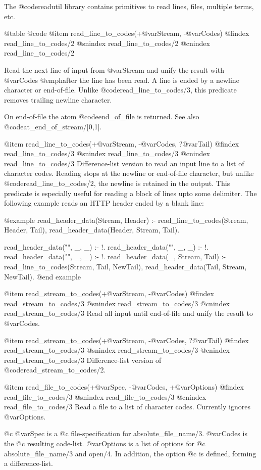 {{{{{{{{The @code{readutil} library contains primitives to read lines, files,
multiple terms, etc.

@table @code
@item read_line_to_codes(+@var{Stream}, -@var{Codes})
@findex read_line_to_codes/2
@snindex read_line_to_codes/2
@cnindex read_line_to_codes/2

Read the next line of input from @var{Stream} and unify the result with
@var{Codes} @emph{after} the line has been read.  A line is ended by a
newline character or end-of-file. Unlike @code{read_line_to_codes/3},
this predicate removes trailing newline character.

On end-of-file the atom @code{end_of_file} is returned.  See also
@code{at_end_of_stream/[0,1]}.

@item read_line_to_codes(+@var{Stream}, -@var{Codes}, ?@var{Tail})
@findex read_line_to_codes/3
@snindex read_line_to_codes/3
@cnindex read_line_to_codes/3
Difference-list version to read an input line to a list of character
codes.  Reading stops at the newline or end-of-file character, but
unlike @code{read_line_to_codes/2}, the newline is retained in the
output.  This predicate is especially useful for reading a block of
lines upto some delimiter.  The following example reads an HTTP header
ended by a blank line:

@example
read_header_data(Stream, Header) :-
	read_line_to_codes(Stream, Header, Tail),
	read_header_data(Header, Stream, Tail).

read_header_data("\r\n", _, _) :- !.
read_header_data("\n", _, _) :- !.
read_header_data("", _, _) :- !.
read_header_data(_, Stream, Tail) :-
	read_line_to_codes(Stream, Tail, NewTail),
	read_header_data(Tail, Stream, NewTail).
@end example

@item read_stream_to_codes(+@var{Stream}, -@var{Codes})
@findex read_stream_to_codes/3
@snindex read_stream_to_codes/3
@cnindex read_stream_to_codes/3
Read all input until end-of-file and unify the result to @var{Codes}.

@item read_stream_to_codes(+@var{Stream}, -@var{Codes}, ?@var{Tail})
@findex read_stream_to_codes/3
@snindex read_stream_to_codes/3
@cnindex read_stream_to_codes/3
Difference-list version of @code{read_stream_to_codes/2}.

@item read_file_to_codes(+@var{Spec}, -@var{Codes}, +@var{Options})
@findex read_file_to_codes/3
@snindex read_file_to_codes/3
@cnindex read_file_to_codes/3
Read a file to a list of character codes. Currently ignores
@var{Options}.

@c  @var{Spec} is a
@c file-specification for absolute_file_name/3.  @var{Codes} is the
@c resulting code-list.  @var{Options} is a list of options for
@c absolute_file_name/3 and open/4.  In addition, the option
@c  is defined, forming a difference-list.

}}}}}}}}
